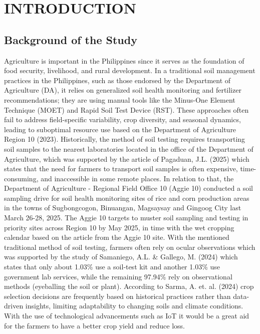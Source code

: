 \chapter{INTRODUCTION}

{\baselineskip}
\begin{doublespace}
\section{Background of the Study}

Agriculture is important in the Philippines since it serves as the foundation of food security, livelihood, and rural development. In a traditional soil management practices in the Philippines, such as those endorsed by the Department of Agriculture (DA), it relies on generalized soil health monitoring and fertilizer recommendations; they are using manual tools like the Minus-One Element Technique (MOET) and Rapid Soil Test Device (RST). These approaches often fail to address field-specific variability, crop diversity, and seasonal dynamics, leading to suboptimal resource use based on the Department of Agriculture Region 10 (2023). Historically, the method of soil testing requires transporting soil samples to the nearest laboratories located in the office of the Department of Agriculture, which was supported by the article of Pagaduan, J.L. (2025) which states that the need for farmers to transport soil samples is often expensive, time-consuming, and inaccessible in some remote places. In relation to that, the Department of Agriculture - Regional Field Office 10 (Aggie 10) conducted a soil sampling drive for soil health monitoring sites of rice and corn production areas in the towns of Sugbongcogon, Binuangan, Magsaysay and Gingoog City last March 26-28, 2025. The Aggie 10 targets to muster soil sampling and testing in priority sites across Region 10 by May 2025, in time with the wet cropping calendar based on the article from the Aggie 10 site. With the mentioned traditional method of soil testing, farmers often rely on ocular observations which was supported by the study of Samaniego, A.L. \& Gallego, M. (2024) which states that only about 1.03\% use a soil‐test kit and another 1.03\% use government lab services, while the remaining 97.94\% rely on observational methods (eyeballing the soil or plant). According to Sarma, A. et. al. (2024) crop selection decisions are frequently based on historical practices rather than data-driven insights, limiting adaptability to changing soils and climate conditions. With the use of technological advancements such as IoT it would be a great aid for the farmers to have a better crop yield and reduce loss.


\end{doublespace}
